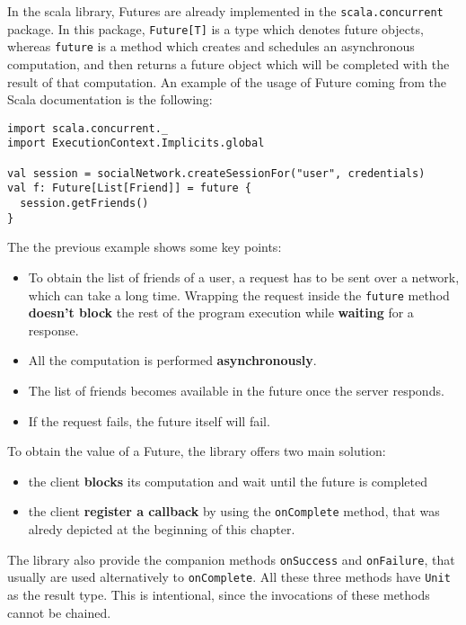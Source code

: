 In the scala library, Futures are already implemented in the
\texttt{scala.concurrent} package. In this package,
\texttt{Future{[}T{]}} is a type which denotes future objects, whereas
\texttt{future} is a method which creates and schedules an asynchronous
computation, and then returns a future object which will be completed
with the result of that computation. An example of the usage of Future
coming from the Scala documentation is the following:

\begin{verbatim}
import scala.concurrent._
import ExecutionContext.Implicits.global

val session = socialNetwork.createSessionFor("user", credentials)
val f: Future[List[Friend]] = future {
  session.getFriends()
}
\end{verbatim}

The the previous example shows some key points:

\begin{itemize}
\itemsep1pt\parskip0pt
\item
  To obtain the list of friends of a user, a request has to be sent over
  a network, which can take a long time. Wrapping the request inside the
  \texttt{future} method \textbf{doesn't block} the rest of the program
  execution while \textbf{waiting} for a response.
\item
  All the computation is performed \textbf{asynchronously}.
\item
  The list of friends becomes available in the future once the server
  responds.
\item
  If the request fails, the future itself will fail.
\end{itemize}

To obtain the value of a Future, the library offers two main solution:

\begin{itemize}
\itemsep1pt\parskip0pt
\item
  the client \textbf{blocks} its computation and wait until the future
  is completed
\item
  the client \textbf{register a callback} by using the
  \texttt{onComplete} method, that was alredy depicted at the beginning
  of this chapter.
\end{itemize}

The library also provide the companion methods \texttt{onSuccess} and
\texttt{onFailure}, that usually are used alternatively to
\texttt{onComplete}. All these three methods have \texttt{Unit} as the
result type. This is intentional, since the invocations of these methods
cannot be chained.

